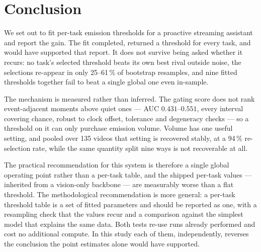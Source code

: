 \section{Conclusion}
\label{sec:conclusion}

We set out to fit per-task emission thresholds for a proactive streaming
assistant and report the gain. The fit completed, returned a threshold for every
task, and would have supported that report. It does not survive being asked whether
it recurs: no task's selected threshold beats its own best rival outside noise,
the selections re-appear in only 25--61\,\% of bootstrap resamples, and nine fitted
thresholds together fail to beat a single global one even in-sample.

The mechanism is measured rather than inferred. The gating score does not rank
event-adjacent moments above quiet ones --- AUC $0.431$--$0.551$, every interval
covering chance, robust to clock offset, tolerance and degeneracy checks --- so a
threshold on it can only purchase emission volume. Volume has one useful setting,
and pooled over 135 videos that setting is recovered stably, at a 94\,\%
re-selection rate, while the same quantity split nine ways is not recoverable at
all.

The practical recommendation for this system is therefore a single global operating
point rather than a per-task table, and the shipped per-task values --- inherited
from a vision-only backbone --- are measurably worse than a flat threshold. The
methodological recommendation is more general: a per-task threshold table is a set
of fitted parameters and should be reported as one, with a resampling check that
the values recur and a comparison against the simplest model that explains the same
data. Both tests re-use runs already performed and cost no additional compute. In
this study each of them, independently, reverses the conclusion the point estimates
alone would have supported.
